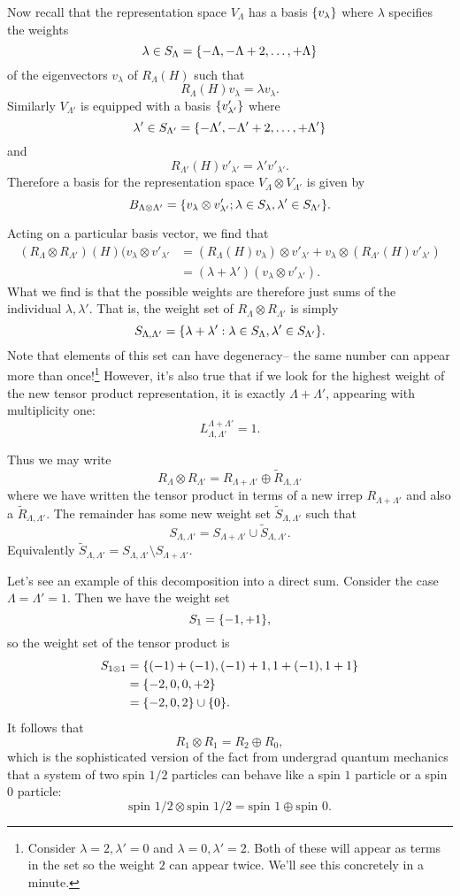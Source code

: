 Now recall that the representation space $V_\Lambda$ has a basis $\{v_\lambda\}$ where $\lambda$ specifies the weights
$$\lambda \in S_\Lambda = \{-\Lambda,-\Lambda+2,\ldots,+\Lambda\}$$
of the eigenvectors $v_\lambda$ of $R_\Lambda(H)$ such that
$$R_\Lambda(H)v_\lambda = \lambda v_\lambda.$$
Similarly $V_{\Lambda'}$ is equipped with a basis
$\{v'_{\lambda'}\}$ where 
$$\lambda' \in S_{\Lambda'} = \{-\Lambda',-\Lambda'+2,\ldots,+\Lambda'\}$$
and
$$R_{\Lambda'}(H)v'_{\lambda'}=\lambda' v'_{\lambda'}.$$
Therefore a basis for the representation space $V_\Lambda \otimes V_{\Lambda'}$ is given by
$$B_{\Lambda \otimes \Lambda'} = \{v_\lambda \otimes v'_{\lambda'}; \lambda \in S_\lambda, \lambda' \in S_{\Lambda'}\}.$$

Acting on a particular basis vector, we find that
\begin{align*}
    (R_\Lambda \otimes R_{\Lambda'})(H)(v_\lambda \otimes v'_{\lambda'}         &=(R_\Lambda(H)v_\lambda) \otimes v'_{\lambda'}+v_\lambda \otimes           (R_{\Lambda'}(H)v'_{\lambda'})\\
        &= (\lambda + \lambda')(v_\lambda \otimes v'_{\lambda'}).
\end{align*}
What we find is that the possible weights are therefore just sums of the individual $\lambda,\lambda'$. That is, the weight set of $R_\Lambda \otimes R_{\Lambda'}$ is simply
$$S_{\Lambda,\Lambda'}=\{\lambda+\lambda': \lambda\in S_{\Lambda},\lambda'\in S_{\Lambda'}\}.$$
Note that elements of this set can have degeneracy-- the same number can appear more than once!\footnote{Consider $\lambda=2,\lambda'=0$ and $\lambda=0,\lambda'=2$. Both of these will appear as terms in the set so the weight $2$ can appear twice. We'll see this concretely in a minute.} However, it's also true that if we look for the highest weight of the new tensor product representation, it is exactly $\Lambda+\Lambda'$, appearing with multiplicity one:
$$L^{\Lambda+\Lambda'}_{\Lambda,\Lambda'}=1.$$

Thus we may write
$$R_\Lambda \otimes R_{\Lambda'}=R_{\Lambda+\Lambda'}\oplus \tilde R_{\Lambda,\Lambda'}$$
where we have written the tensor product in terms of a new irrep $R_{\Lambda+\Lambda'}$ and also a  $\tilde R_{\Lambda,\Lambda'}$. The remainder has some new weight set $\tilde S_{\Lambda, \Lambda'}$ such that
$$S_{\Lambda,\Lambda'}=S_{\Lambda+\Lambda'} \cup \tilde S_{\Lambda,\Lambda'}.$$
Equivalently $\tilde S_{\Lambda,\Lambda'}=S_{\Lambda,\Lambda'}\setminus S_{\Lambda+\Lambda'}.$

Let's see an example of this decomposition into a direct sum. Consider the case $\Lambda=\Lambda'=1.$ Then we have the weight set
$$S_1=\{-1,+1\},$$
so the weight set of the tensor product is
\begin{align*}
S_{1\otimes 1}&=\{(-1)+(-1),(-1)+1,1+(-1),1+1\}\\
&=\{-2,0,0,+2\}\\
&=\{-2,0,2\}\cup \{0\}.
\end{align*}
It follows that
$$R_1\otimes R_1 = R_2 \oplus R_0,$$
which is the sophisticated version of the fact from undergrad quantum mechanics that a system of two spin $1/2$ particles can behave like a spin $1$ particle or a spin $0$ particle:
$$\text{spin }1/2 \otimes \text{spin } 1/2 = \text{spin }1 \oplus \text{spin } 0.$$